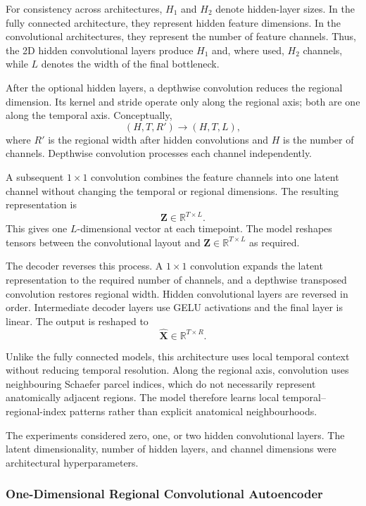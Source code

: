 For consistency across architectures, $H_1$ and $H_2$ denote hidden-layer
sizes. In the fully connected architecture, they represent hidden feature
dimensions. In the convolutional architectures, they represent the
number of feature channels. Thus, the 2D hidden convolutional layers
produce $H_1$ and, where used, $H_2$ channels, while $L$ denotes the
width of the final bottleneck.

After the optional hidden layers, a depthwise convolution reduces the
regional dimension. Its kernel and stride operate only along the
regional axis; both are one along the temporal axis. Conceptually,
\[
(H,T,R')
\rightarrow
(H,T,L),
\]
where $R'$ is the regional width after hidden convolutions and $H$ is the
number of channels. Depthwise convolution processes each channel
independently.

A subsequent $1\times1$ convolution combines the feature channels into
one latent channel without changing the temporal or regional dimensions.
The resulting representation is
\[
\mathbf{Z}\in\mathbb{R}^{T\times L}.
\]
This gives one $L$-dimensional vector at each timepoint. The model
reshapes tensors between the convolutional layout and
$\mathbf{Z}\in\mathbb{R}^{T\times L}$ as required.

The decoder reverses this process. A $1\times1$ convolution expands the
latent representation to the required number of channels, and a
depthwise transposed convolution restores regional width. Hidden
convolutional layers are reversed in order. Intermediate decoder layers
use GELU activations and the final layer is linear. The output is
reshaped to
\[
\hat{\mathbf{X}}\in\mathbb{R}^{T\times R}.
\]

Unlike the fully connected models, this architecture uses local temporal
context without reducing temporal resolution. Along the regional axis,
convolution uses neighbouring Schaefer parcel indices, which do not
necessarily represent anatomically adjacent regions. The model therefore
learns local temporal--regional-index patterns rather than explicit
anatomical neighbourhoods.

The experiments considered zero, one, or two hidden convolutional
layers. The latent dimensionality, number of hidden layers, and channel
dimensions were architectural hyperparameters.

\subsubsection{One-Dimensional Regional Convolutional Autoencoder}

